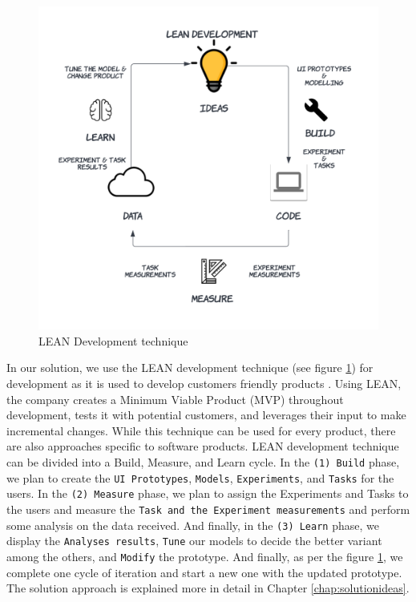 \begin{figure}[ht]
    \centering
    \includegraphics[scale=0.15]{images/solution-ideas/LEAN.png}
    \caption{LEAN Development technique}
    \label{intro:fig:lean}
\end{figure}

In our solution, we use the LEAN development technique (see figure \ref{intro:fig:lean}) for development as it is used to develop customers friendly products \cite{article:lean:hart}.
Using LEAN, the company creates a Minimum Viable Product (MVP) throughout development, tests it with potential customers, and leverages their input to make incremental changes.
While this technique can be used for every product, there are also approaches specific to software products.
LEAN development technique can be divided into a Build, Measure, and Learn cycle. 
In the \texttt{(1) Build} phase, we plan to create the \texttt{UI Prototypes}, \texttt{Models}, \texttt{Experiments}, and \texttt{Tasks} for the users.
In the \texttt{(2) Measure} phase, we plan to assign the Experiments and Tasks to the users and measure the \texttt{Task and the Experiment measurements} and perform some analysis on the data received. 
And finally, in the \texttt{(3) Learn} phase, we display the \texttt{Analyses results}, \texttt{Tune} our models to decide the better variant among the others, and \texttt{Modify} the prototype.
And finally, as per the figure \ref{intro:fig:lean}, we complete one cycle of iteration and start a new one with the updated prototype.
The solution approach is explained more in detail in Chapter \ref{chap:solutionideas}.

